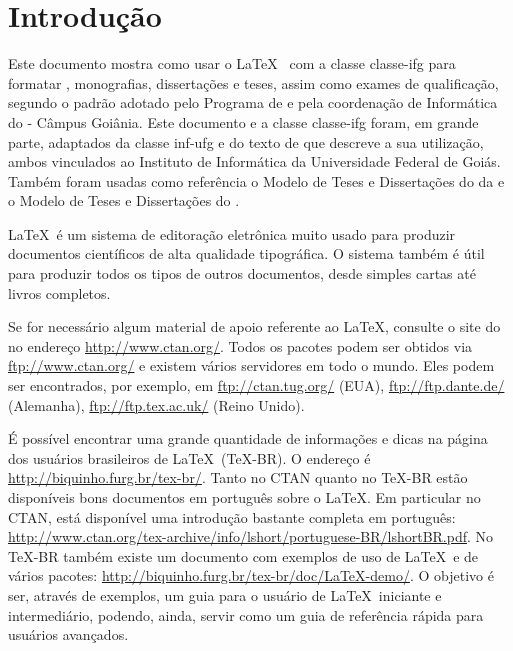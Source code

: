 
\chapter{Introdução}
\label{cap:intro}

Este documento mostra como usar o \LaTeX\ \cite{mittelbach2004latex} com a classe \textsf{classe-ifg} para formatar , monografias, dissertações e teses, assim como exames de qualificação, segundo o padrão adotado pelo Programa de  e pela coordenação de Informática do  - Câmpus Goiânia. Este documento e a classe \textsf{classe-ifg} foram, em grande parte, adaptados da classe \textsf{inf-ufg} e do texto de  que descreve a sua utilização, ambos vinculados ao Instituto de Informática da Universidade Federal de Goiás. Também foram usadas como referência o Modelo de Teses e Dissertações do  da  \cite{icmc-usp} e o Modelo de Teses e Dissertações do  \cite{inpe}.

\LaTeX\ é um sistema de editoração eletrônica muito usado para produzir documentos científicos de alta qualidade tipográfica. O sistema também é útil para produzir todos os tipos de outros documentos, desde simples cartas até livros completos.

Se for necessário algum material de apoio referente ao \LaTeX, consulte o site do  no endereço \url{http://www.ctan.org/}. Todos os pacotes podem ser obtidos via  \url{ftp://www.ctan.org/} e existem vários servidores em todo o mundo. Eles podem ser encontrados, por exemplo, em \url{ftp://ctan.tug.org/} (EUA), \url{ftp://ftp.dante.de/} (Alemanha), \url{ftp://ftp.tex.ac.uk/} (Reino Unido).

É possível encontrar uma grande quantidade de informações e dicas na página dos usuários brasileiros de \LaTeX\ (\TeX-BR). O endereço é \url{http://biquinho.furg.br/tex-br/}. Tanto no CTAN quanto no \TeX-BR estão disponíveis bons documentos em português sobre o \LaTeX. Em particular no CTAN, está disponível uma introdução bastante completa em português: \url{http://www.ctan.org/tex-archive/info/lshort/portuguese-BR/lshortBR.pdf}. No \TeX-BR também existe um documento com exemplos de uso de \LaTeX\ e de vários pacotes: \url{http://biquinho.furg.br/tex-br/doc/LaTeX-demo/}. O objetivo é ser, através de exemplos, um guia para o usuário de \LaTeX\ iniciante e intermediário, podendo, ainda, servir como um guia de referência rápida para usuários avançados.

